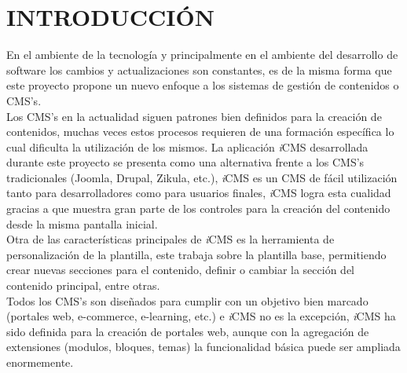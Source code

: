 
\chapter{INTRODUCCI\'ON}
\newpage

En el ambiente de la tecnolog\'ia y principalmente en el ambiente del desarrollo de software los cambios y actualizaciones son constantes, es de la misma forma que este proyecto propone un nuevo enfoque a los sistemas de gesti\'on de contenidos o CMS's.\\
Los CMS's en la actualidad siguen patrones bien definidos para la creaci\'on de contenidos, muchas veces estos procesos requieren de una formaci\'on espec\'ifica lo cual dificulta la utilizaci\'on de los mismos. La aplicaci\'on \textit{i}CMS desarrollada durante este proyecto se presenta como una alternativa frente a los CMS's tradicionales (Joomla, Drupal, Zikula, etc.), \textit{i}CMS es un CMS de f\'acil utilizaci\'on tanto para desarrolladores como para usuarios finales, \textit{i}CMS logra esta cualidad gracias a que muestra gran parte de los controles para la creaci\'on del contenido desde la misma pantalla inicial.\\
Otra de las caracter\'isticas principales de \textit{i}CMS es la herramienta de personalizaci\'on de la plantilla, este trabaja sobre la plantilla base, permitiendo crear nuevas secciones para el contenido, definir o cambiar la secci\'on del contenido principal, entre otras.\\
Todos los CMS's son dise\~nados para cumplir con un objetivo bien marcado (portales web, e-commerce, e-learning, etc.) e \textit{i}CMS no es la excepci\'on, \textit{i}CMS ha sido definida para la creaci\'on de portales web, aunque con la agregaci\'on de extensiones (modulos, bloques, temas) la funcionalidad b\'asica puede ser ampliada enormemente.

%
\clearpage
